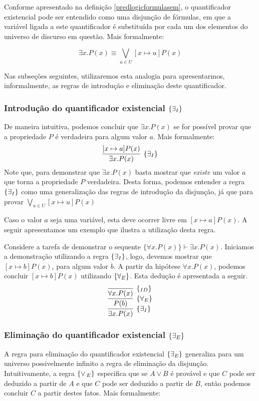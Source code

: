 Conforme apresentado na definição \ref{predlogicformulasem}, o
quantificador existencial pode ser entendido como uma disjunção de
fórmulas, em que a variável ligada a este quantificador é substituída
por cada um dos elementos do universo de discurso em questão. Mais
formalmente:

\[\exists x. P(x) \equiv \bigvee\limits_{u\in U}[x\mapsto u]P(x)\]

Nas subseções seguintes, utilizaremos esta analogia para
apresentarmos, informalmente, as regras de introdução e eliminação
deste quantificador.

\subsubsection{Introdução do quantificador existencial $\scriptsize{\{\exists_I}\}$}

De maneira intuitiva, podemos concluir que $\exists x. P(x)$ se for
possível provar que a propriedade $P$ é verdadeira para algum valor
$a$. Mais formalmente:
\[
\infer[\existsI]{\exists x. P(x)}
         {
           [x\mapsto a]P(x)
         }
\]
Note que, para demonstrar que $\exists x. P(x)$ basta mostrar que
\emph{existe} um valor $a$ que torna a propriedade $P$
verdadeira. Desta forma, podemos entender a regra $\scriptsize{\{\exists_I}\}$ como uma
generalização das regras de introdução da disjunção, já que para
provar $\bigvee_{u\in U}  [x\mapsto u]P(x)$

Caso o valor $a$ seja uma variável, esta deve ocorrer livre em
$[x\mapsto a]P(x)$. A seguir apresentamos um exemplo que ilustra a
utilização desta regra.
\begin{Example}
Considere a tarefa de demonstrar o sequente $\{\forall x. P(x)\}
\vdash \exists x. P(x)$. Iniciamos a demonstração utilizando a regra
$\scriptsize{\{\exists_I}\}$, logo, devemos mostrar que $[x\mapsto b]P(x)$, para algum
valor $b$. A partir da hipótese $\forall x .P(x)$, podemos concluir
$[x\mapsto b]P(x)$ utilizando $\scriptsize{\{\forall_E}\}$. Esta dedução é apresentada a
seguir.
\[
\infer[\existsI]{\exists x. P(x)}
        {
          \infer[\forallE]{P(b)}
                   {
                     \infer[\Id]{\forall x. P(x)}{}
                   }
        }
\]
\end{Example}

\subsubsection{Eliminação do quantificador existencial $\scriptsize{\{\exists_E}\}$}

A regra para eliminação do quantificador existencial $\scriptsize{\{\exists_E}\}$
generaliza para um universo possivelmente infinito a regra de
eliminação da disjunção. Intuitivamente,  a regra $\scriptsize{\{\lor\,_{E}\}}$ especifica
que se $A\lor B$ é provável e que $C$ pode ser deduzido a partir de
$A$ e que $C$ pode ser deduzido a partir de $B$, então podemos
concluir $C$ a partir destes fatos. Mais formalmente:

